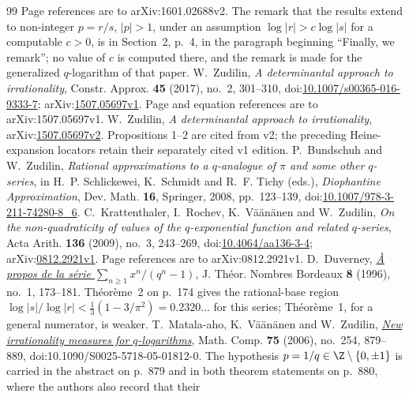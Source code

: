 \begin{thebibliography}{99}
  Page references are to arXiv:1601.02688v2.
  The remark that the results extend to non-integer \(p=r/s\), \(|p|>1\), under
  an assumption \(\log|r|>c\log|s|\) for a computable \(c>0\), is in Section~2,
  p.~4, in the paragraph beginning ``Finally, we remark''; no value of \(c\) is
  computed there, and the remark is made for the generalized \(q\)-logarithm of
  that paper.
 W.~Zudilin, \emph{A determinantal approach to
  irrationality}, Constr. Approx. \textbf{45} (2017), no.~2, 301--310,
  doi:\href{https://doi.org/10.1007/s00365-016-9333-7}{10.1007/s00365-016-9333-7};
  arXiv:\href{https://arxiv.org/abs/1507.05697v1}{1507.05697v1}.
  Page and equation references are to arXiv:1507.05697v1.
 W.~Zudilin, \emph{A determinantal approach to
  irrationality}, arXiv:\href{https://arxiv.org/abs/1507.05697v2}{1507.05697v2}.
  Propositions 1--2 are cited from v2; the preceding Heine-expansion
  locators retain their separately cited v1 edition.
 P.~Bundschuh and W.~Zudilin, \emph{Rational
  approximations to a \(q\)-analogue of \(\pi\) and some other \(q\)-series},
  in H.~P. Schlickewei, K.~Schmidt and R.~F. Tichy (eds.), \emph{Diophantine
  Approximation}, Dev. Math. \textbf{16}, Springer, 2008, pp.~123--139,
  doi:\href{https://doi.org/10.1007/978-3-211-74280-8_6}{10.1007/978-3-211-74280-8\_6}.
 C.~Krattenthaler, I.~Rochev, K.~V\"a\"an\"anen and
  W.~Zudilin, \emph{On the non-quadraticity of values of the
  \(q\)-exponential function and related \(q\)-series}, Acta Arith.
  \textbf{136} (2009), no.~3, 243--269,
  doi:\href{https://doi.org/10.4064/aa136-3-4}{10.4064/aa136-3-4};
  arXiv:\href{https://arxiv.org/abs/0812.2921v1}{0812.2921v1}.
  Page references are to arXiv:0812.2921v1.
 D.~Duverney,
  \href{https://numdam.org/item/JTNB_1996__8_1_173_0.pdf}{\emph{\`A propos de la
  s\'erie $\sum_{n\ge1}x^{n}/(q^{n}-1)$}},
  J. Th\'eor. Nombres Bordeaux \textbf{8} (1996), no.~1, 173--181.
  Th\'eor\`eme~2 on p.~174 gives the rational-base region
  $\log|s|/\log|r|<\frac13(1-3/\pi^{2})=0.2320\ldots$ for this series;
  Th\'eor\`eme~1, for a general numerator, is weaker.
 T.~Matala-aho, K.~V\"a\"an\"anen and W.~Zudilin,
  \href{https://doi.org/10.1090/S0025-5718-05-01812-0}{\emph{New irrationality
  measures for \(q\)-logarithms}}, Math. Comp. \textbf{75} (2006), no.~254,
  879--889, doi:10.1090/S0025-5718-05-01812-0.  The hypothesis
  \(p=1/q\in\Z\mathbin{\backslash}\{0,\pm1\}\) is carried in the abstract on p.~879 and in
  both theorem statements on p.~880, where the authors also record that their

\end{thebibliography}
